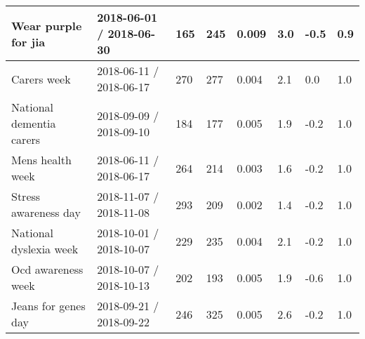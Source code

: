 \begin{tabularx}{\textwidth}{|X|P{1.8cm}|P{1.2cm}|P{1cm}|P{1.4cm}|P{1.2cm}|P{1.3cm}|P{1cm}|}
Wear purple for jia & 2018-06-01 / 2018-06-30 & 165 & 245 & 0.009 & 3.0 & -0.5 & 0.9 \\ \hline
Carers week & 2018-06-11 / 2018-06-17 & 270 & 277 & 0.004 & 2.1 & 0.0 & 1.0 \\ \hline
National dementia carers & 2018-09-09 / 2018-09-10 & 184 & 177 & 0.005 & 1.9 & -0.2 & 1.0 \\ \hline
Mens health week & 2018-06-11 / 2018-06-17 & 264 & 214 & 0.003 & 1.6 & -0.2 & 1.0 \\ \hline
Stress awareness day & 2018-11-07 / 2018-11-08 & 293 & 209 & 0.002 & 1.4 & -0.2 & 1.0 \\ \hline
National dyslexia week & 2018-10-01 / 2018-10-07 & 229 & 235 & 0.004 & 2.1 & -0.2 & 1.0 \\ \hline
Ocd awareness week & 2018-10-07 / 2018-10-13 & 202 & 193 & 0.005 & 1.9 & -0.6 & 1.0 \\ \hline
Jeans for genes day & 2018-09-21 / 2018-09-22 & 246 & 325 & 0.005 & 2.6 & -0.2 & 1.0 \\ \hline

\end{tabularx}
